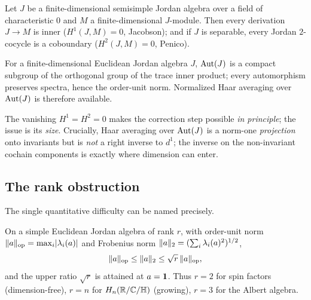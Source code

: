 \begin{theorem}\label{thm:whitehead}
Let $J$ be a finite-dimensional semisimple Jordan algebra over a field of
characteristic $0$ and $M$ a finite-dimensional $J$-module. Then every derivation
$J\to M$ is inner ($H^{1}(J,M)=0$, Jacobson); and if $J$ is separable, every
Jordan $2$-cocycle is a coboundary ($H^{2}(J,M)=0$, Penico).
\end{theorem}

\begin{proposition}\label{prop:aut-compact}
For a finite-dimensional Euclidean Jordan algebra $J$, $\operatorname{Aut}(J)$ is a compact
subgroup of the orthogonal group of the trace inner product; every automorphism
preserves spectra, hence the order-unit norm. Normalized Haar averaging over
$\operatorname{Aut}(J)$ is therefore available.
\end{proposition}

The vanishing $H^{1}=H^{2}=0$ makes the correction step possible \emph{in
principle}; the issue is its \emph{size}. Crucially, Haar averaging over
$\operatorname{Aut}(J)$ is a norm-one \emph{projection} onto invariants but is \emph{not} a
right inverse to $d^1$; the inverse on the non-invariant cochain components is
exactly where dimension can enter.

\subsection{The rank obstruction}

The single quantitative difficulty can be named precisely.

\begin{proposition}
\label{prop:rank-gap}
On a simple Euclidean Jordan algebra of rank $r$, with order-unit norm
$\lVert a \rVert_{\mathrm{op}}=\max_i\lvert\lambda_i(a)\rvert$ and Frobenius norm
$\lVert a \rVert_2=(\sum_i\lambda_i(a)^2)^{1/2}$,
\[
  \lVert a \rVert_{\mathrm{op}}\le\lVert a \rVert_2\le\sqrt{r}\,\lVert a \rVert_{\mathrm{op}},
\]
and the upper ratio $\sqrt r$ is attained at $a=\mathbf{1}$. Thus
$r=2$ for spin factors (dimension-free), $r=n$ for $H_n(\mathbb{R}/\mathbb{C}/\mathbb H)$
(growing), $r=3$ for the Albert algebra.
\end{proposition}

